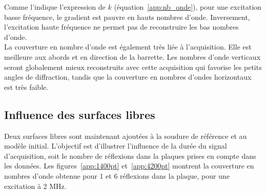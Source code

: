 Comme l'indique l'expression de $k$ (équation~\ref{app:nb_onde}), pour une excitation basse fréquence, le gradient est pauvre en hauts nombres d'onde. Inversement, l'excitation haute fréquence ne permet pas de reconstruire les bas nombres d'onde.\\
La couverture en nombre d'onde est également très liée à l'acquisition. Elle est meilleure aux abords et en direction de la barrette. Les nombres d'onde verticaux seront globalement mieux reconstruits avec cette acquisition qui favorise les petits angles de diffraction, tandis que la couverture en nombres d'ondes horizontaux est très faible.

\subsection{Influence des surfaces libres}

Deux surfaces libres sont maintenant ajoutées à la soudure de référence et au modèle initial. L'objectif est d'illustrer l'influence de la durée du signal d'acquisition, soit le nombre de réflexions dans la plaques prises en compte dans les données. Les figures~\ref{app:1400pt} et~\ref{app:4200pt} montrent la couverture en nombres d'onde obtenue  pour 1 et 6 réflexions dans la plaque, pour une excitation à 2 MHz.

